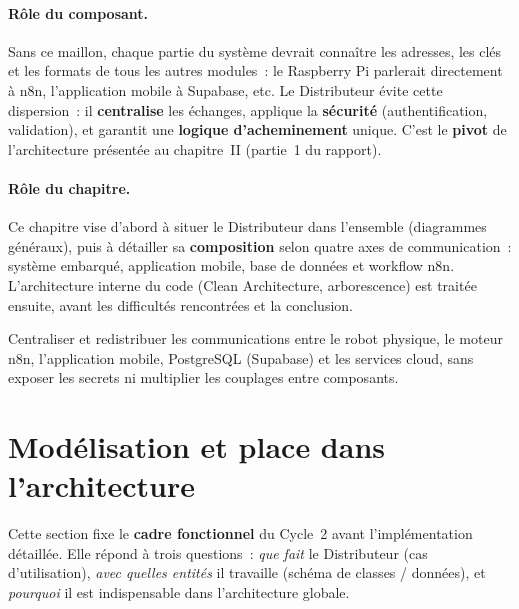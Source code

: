 \documentclass[a4paper,12pt]{report}
\begin{document}
	\paragraph{Rôle du composant.}
	Sans ce maillon, chaque partie du système devrait connaître les adresses, les clés
	et les formats de tous les autres modules~: le Raspberry Pi parlerait directement à
	n8n, l'application mobile à Supabase, etc. Le Distributeur évite cette dispersion~:
	il \textbf{centralise} les échanges, applique la \textbf{sécurité} (authentification,
	validation), et garantit une \textbf{logique d'acheminement} unique. C'est le
	\textbf{pivot} de l'architecture présentée au chapitre~II (partie~1 du rapport).
	
	\paragraph{Rôle du chapitre.}
	Ce chapitre vise d'abord à situer le Distributeur dans l'ensemble (diagrammes
	généraux), puis à détailler sa \textbf{composition} selon quatre axes de
	communication~: système embarqué, application mobile, base de données et workflow
	n8n. L'architecture interne du code (Clean Architecture, arborescence) est traitée
	ensuite, avant les difficultés rencontrées et la conclusion.
	
	\begin{tcolorbox}[colback=blue!5!white, colframe=blue!60!black,
		title=\textbf{Rôle principal du Distributeur de Services}]
		Centraliser et redistribuer les communications entre le robot physique, le
		moteur n8n, l'application mobile, PostgreSQL (Supabase) et les services cloud,
		sans exposer les secrets ni multiplier les couplages entre composants.
	\end{tcolorbox}
	
	\section{Modélisation et place dans l'architecture}
	\label{sec:ch4-modelisation}
	
	Cette section fixe le \textbf{cadre fonctionnel} du Cycle~2 avant l'implémentation
	détaillée. Elle répond à trois questions~: \emph{que fait} le Distributeur (cas
	d'utilisation), \emph{avec quelles entités} il travaille (schéma de classes /
	données), et \emph{pourquoi} il est indispensable dans l'architecture globale.
	
\end{document}
